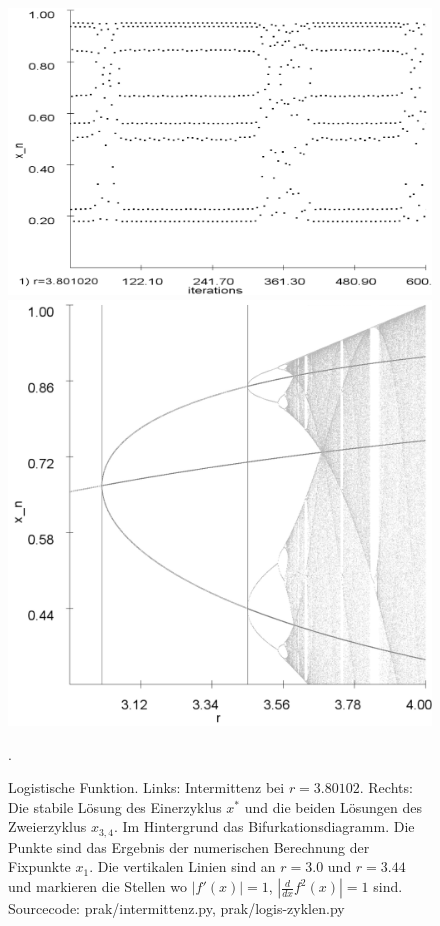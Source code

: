 \documentclass[12pt,a4paper]{article}
\begin{document}
\begin{figure}[!htbp]
\centering
\includegraphics[scale=0.22]{intermittenz}
\includegraphics[scale=0.15]{analy-periodenv}
\caption{Logistische Funktion. Links: Intermittenz bei $r=3.80102$. Rechts: Die stabile Lösung des Einerzyklus $x^*$ und die beiden Lösungen des Zweierzyklus $x_{3,4}$. Im Hintergrund das Bifurkationsdiagramm. Die Punkte sind das Ergebnis der numerischen Berechnung der Fixpunkte $x_1$. Die vertikalen Linien sind an $r=3.0$ und $r=3.44$ und markieren die Stellen wo $|f'(x)|=1$, $|\frac{d}{dx}f^2(x)|=1$ sind. Sourcecode: prak/intermittenz.py, prak/logis-zyklen.py}. 
\label{fig:log-intermittenz-cycles}
\end{figure}
\end{document}
